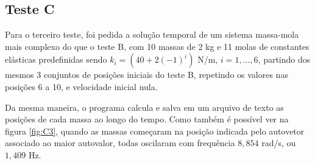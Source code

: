 \documentclass[12pt]{article} %
\begin{document}
        \newpage
    
    \subsection{Teste C}
    
        Para o terceiro teste, foi pedida a solução temporal de um sistema massa-mola mais complexo do que o teste B, com 10 massas de 2 kg e 11 molas de constantes elásticas predefinidas sendo $k_i = (40+2(-1)^i)$ N/m, $i = 1,...,6$, partindo dos mesmos 3 conjuntos de posições iniciais do teste B, repetindo os valores nas posições 6 a 10, e velocidade inicial nula.
        
        Da mesma maneira, o programa calcula e salva em um arquivo de texto as posições de cada massa ao longo do tempo. Como também é possível ver na figura \ref{fig:C3}, quando as massas começaram na posição indicada pelo autovetor associado ao maior autovalor, todas oscilaram com frequência $8,854$ rad/s, ou $1,409$ Hz.
        
\end{document}
